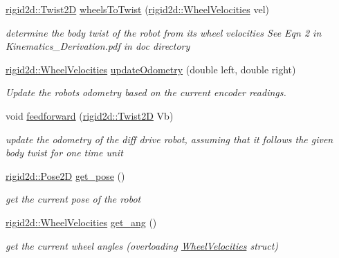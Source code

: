 \begin{DoxyCompactItemize}
\hyperlink{classrigid2d_1_1Twist2D}{rigid2d\+::\+Twist2D} \hyperlink{classrigid2d_1_1DiffDrive_ae559cc4d15746a05cbd3ac73c1d47517}{wheels\+To\+Twist} (\hyperlink{structrigid2d_1_1WheelVelocities}{rigid2d\+::\+Wheel\+Velocities} vel)
\begin{DoxyCompactList}\small\item\em determine the body twist of the robot from its wheel velocities See Eqn 2 in Kinematics\+\_\+\+Derivation.\+pdf in doc directory \end{DoxyCompactList}\item 
\hyperlink{structrigid2d_1_1WheelVelocities}{rigid2d\+::\+Wheel\+Velocities} \hyperlink{classrigid2d_1_1DiffDrive_a0029cdde3c37edb7e7107416582bd72b}{update\+Odometry} (double left, double right)
\begin{DoxyCompactList}\small\item\em Update the robot\textquotesingle{}s odometry based on the current encoder readings. \end{DoxyCompactList}\item 
void \hyperlink{classrigid2d_1_1DiffDrive_a2828283d8f3c23f78676dee3c0cb417a}{feedforward} (\hyperlink{classrigid2d_1_1Twist2D}{rigid2d\+::\+Twist2D} Vb)
\begin{DoxyCompactList}\small\item\em update the odometry of the diff drive robot, assuming that it follows the given body twist for one time unit \end{DoxyCompactList}\item 
\mbox{\label{classrigid2d_1_1DiffDrive_a7cbac29e12a3aee468bbe4c56ee0d677}} 
\hyperlink{structrigid2d_1_1Pose2D}{rigid2d\+::\+Pose2D} \hyperlink{classrigid2d_1_1DiffDrive_a7cbac29e12a3aee468bbe4c56ee0d677}{get\+\_\+pose} ()
\begin{DoxyCompactList}\small\item\em get the current pose of the robot \end{DoxyCompactList}\item 
\mbox{\label{classrigid2d_1_1DiffDrive_a2010f779df5ea8c763a4a279bdb75b62}} 
\hyperlink{structrigid2d_1_1WheelVelocities}{rigid2d\+::\+Wheel\+Velocities} \hyperlink{classrigid2d_1_1DiffDrive_a2010f779df5ea8c763a4a279bdb75b62}{get\+\_\+ang} ()
\begin{DoxyCompactList}\small\item\em get the current wheel angles (overloading \hyperlink{structrigid2d_1_1WheelVelocities}{Wheel\+Velocities} struct) \end{DoxyCompactList}\item 

\end{DoxyCompactItemize}
